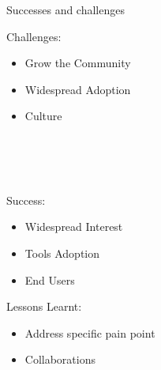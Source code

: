 \documentclass[aspectratio=169,11pt,hyperref={colorlinks=true}]{beamer}
\begin{document}
\begin{3squares}{Successes and challenges}{%
  Challenges:
  \begin{itemize}
    \item Grow the Community
    \item Widespread Adoption
    \item Culture
  \end{itemize}
  ~ \\
  ~ \\
  ~ \\
}{%
Success:
\begin{itemize}
  \item Widespread Interest
  \item Tools Adoption
  \item End Users
\end{itemize}
}{%
Lessons Learnt:
\begin{itemize}
  \item Address specific pain point
  \item Collaborations
\end{itemize}
~ \\
~ \\
~ \\
}
\end{3squares}
\end{document}
